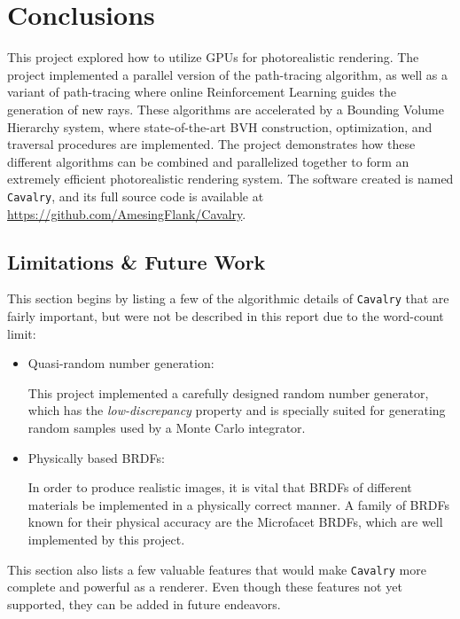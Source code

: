 \chapter{Conclusions}

This project explored how to utilize GPUs for photorealistic rendering. The project implemented a parallel version of the path-tracing algorithm, as well as a variant of path-tracing where online Reinforcement Learning guides the generation of new rays. These algorithms are accelerated by a Bounding Volume Hierarchy system, where state-of-the-art BVH construction, optimization, and traversal procedures are implemented. The project demonstrates how these different algorithms can be combined and parallelized together to form an extremely efficient photorealistic rendering system. The software created is named \texttt{Cavalry}, and its full source code is available at \url{https://github.com/AmesingFlank/Cavalry}.

\section{Limitations \& Future Work}
This section begins by listing a few of the algorithmic details of \texttt{Cavalry} that are fairly important, but were not be described in this report due to the word-count limit:
\begin{itemize}
    \item Quasi-random number generation:
    
    This project implemented a carefully designed random number generator, which has the \textit{low-discrepancy} property and is specially suited for generating random samples used by a Monte Carlo integrator. 

    \item Physically based BRDFs:
    
    In order to produce realistic images, it is vital that BRDFs of different materials be implemented in a physically correct manner. A family of BRDFs known for their physical accuracy are the Microfacet BRDFs\cite{cook1982reflectance}, which are well implemented by this project. 

\end{itemize}

\label{section limitations}
This section also lists a few valuable features that would make \texttt{Cavalry} more complete and powerful as a renderer. Even though these features not yet supported, they can be added in future endeavors.

